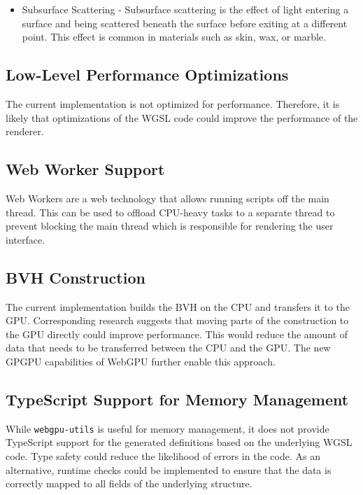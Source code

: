 \begin{itemize}
    \item{Subsurface Scattering} - Subsurface scattering is the effect of light entering a surface and being scattered beneath the surface before exiting at a different point. This effect is common in materials such as skin, wax, or marble.
\end{itemize}


\subsection{Low-Level Performance Optimizations}

The current implementation is not optimized for performance. Therefore, it is likely that optimizations of the \gls{WGSL} code could improve the performance of the renderer.

\subsection{Web Worker Support}

Web Workers are a web technology that allows running scripts off the main thread. This can be used to offload \gls{CPU}-heavy tasks to a separate thread to prevent blocking the main thread which is responsible for rendering the user interface.

\subsection{BVH Construction}

The current implementation builds the \gls{BVH} on the \gls{CPU} and transfers it to the \gls{GPU}. Corresponding research \cite{lauterbach2009GPUbvh} suggests that moving parts of the construction to the \gls{GPU} directly could improve performance. This would reduce the amount of data that needs to be transferred between the \gls{CPU} and the \gls{GPU}. The new \gls{GPGPU} capabilities of WebGPU further enable this approach.

\subsection{TypeScript Support for Memory Management}

While \texttt{webgpu-utils} \cite{webgpuUtilsLib} is useful for memory management, it does not provide TypeScript support for the generated definitions based on the underlying \gls{WGSL} code. Type safety could reduce the likelihood of errors in the code. As an alternative, runtime checks could be implemented to ensure that the data is correctly mapped to all fields of the underlying structure.

